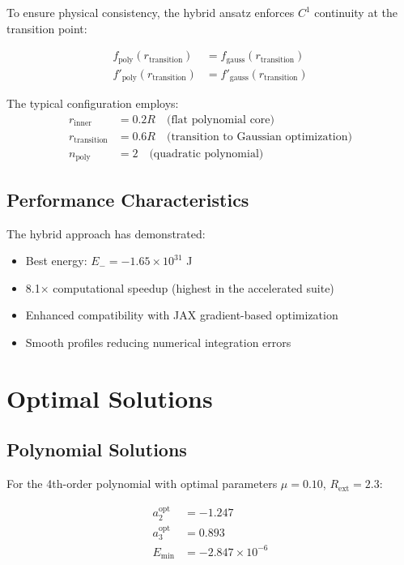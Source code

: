 \documentclass[12pt,a4paper]{article}
\begin{document}
To ensure physical consistency, the hybrid ansatz enforces $C^1$ continuity at the transition point:

\begin{align}
f_{\text{poly}}(r_{\text{transition}}) &= f_{\text{gauss}}(r_{\text{transition}}) \\
f'_{\text{poly}}(r_{\text{transition}}) &= f'_{\text{gauss}}(r_{\text{transition}})
\end{align}

The typical configuration employs:
\begin{align}
r_{\text{inner}} &= 0.2R \quad \text{(flat polynomial core)} \\
r_{\text{transition}} &= 0.6R \quad \text{(transition to Gaussian optimization)} \\
n_{\text{poly}} &= 2 \quad \text{(quadratic polynomial)}
\end{align}

\subsection{Performance Characteristics}

The hybrid approach has demonstrated:
\begin{itemize}
\item Best energy: $E_- = -1.65 \times 10^{31}$ J
\item 8.1× computational speedup (highest in the accelerated suite)
\item Enhanced compatibility with JAX gradient-based optimization
\item Smooth profiles reducing numerical integration errors
\end{itemize}

\section{Optimal Solutions}

\subsection{Polynomial Solutions}

For the 4th-order polynomial with optimal parameters $\mu = 0.10$, $R_{\text{ext}} = 2.3$:

\begin{align}
a_2^{\text{opt}} &= -1.247 \\
a_3^{\text{opt}} &= 0.893 \\
E_{\text{min}} &= -2.847 \times 10^{-6}
\end{align}
\end{document}
